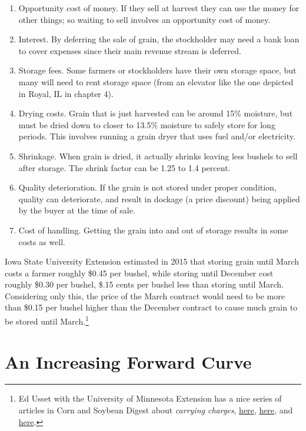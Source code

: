 \documentclass[
]{book}
\providecommand{\tightlist}{%
  \setlength{\itemsep}{0pt}\setlength{\parskip}{0pt}}
\begin{document}
\begin{enumerate}
\def\labelenumi{\arabic{enumi}.}
\tightlist
\item
  Opportunity cost of money. If they sell at harvest they can use the money for other things; so waiting to sell involves an opportunity cost of money.
\item
  Interest. By deferring the sale of grain, the stockholder may need a bank loan to cover expenses since their main revenue stream is deferred.
\item
  Storage fees. Some farmers or stockholders have their own storage space, but many will need to rent storage space (from an elevator like the one depicted in Royal, IL in chapter 4).
\item
  Drying costs. Grain that is just harvested can be around 15\% moisture, but must be dried down to closer to 13.5\% moisture to safely store for long periods. This involves running a grain dryer that uses fuel and/or electricity.
\item
  Shrinkage. When grain is dried, it actually shrinks leaving less bushels to sell after storage. The shrink factor can be 1.25 to 1.4 percent.
\item
  Quality deterioration. If the grain is not stored under proper condition, quality can deteriorate, and result in dockage (a price discount) being applied by the buyer at the time of sale.
\item
  Cost of handling. Getting the grain into and out of storage results in some costs as well.
\end{enumerate}

Iowa State University Extension estimated in 2015 that storing grain until March costs a farmer roughly \$0.45 per bushel, while storing until December cost roughly \$0.30 per bushel, \$.15 cents per bushel less than storing until March. Considering only this, the price of the March contract would need to be more than \$0.15 per bushel higher than the December contract to cause much grain to be stored until March.\footnote{Ed Usset with the University of Minnesota Extension has a nice series of articles in Corn and Soybean Digest about \emph{carrying charges}, \href{http://www.cornandsoybeandigest.com/marketing/understand-carrying-charges}{here}, \href{http://www.cornandsoybeandigest.com/carrying-charges-part-1}{here}, and \href{http://www.cornandsoybeandigest.com/carrying-charges-part-2}{here}.}

\hypertarget{an-increasing-forward-curve}{%
\section{An Increasing Forward Curve}\label{an-increasing-forward-curve}}
\end{document}
